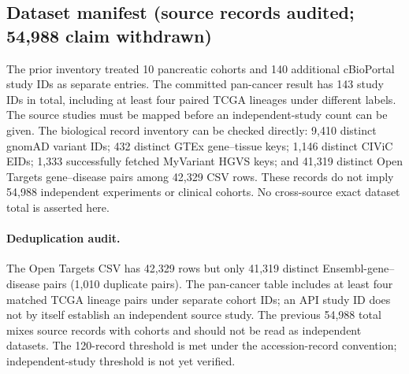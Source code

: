 \subsection{Dataset manifest (source records audited; 54,988 claim withdrawn)}
The prior inventory treated 10 pancreatic cohorts and 140 additional cBioPortal study IDs as separate entries. The committed pan-cancer result has 143 study IDs in total, including at least four paired TCGA lineages under different labels. The source studies must be mapped before an independent-study count can be given. The biological record inventory can be checked directly: 9,410 distinct gnomAD variant IDs; 432 distinct GTEx gene--tissue keys; 1,146 distinct CIViC EIDs; 1,333 successfully fetched MyVariant HGVS keys; and 41,319 distinct Open Targets gene--disease pairs among 42,329 CSV rows. These records do not imply 54,988 independent experiments or clinical cohorts. No cross-source exact dataset total is asserted here.

\paragraph{Deduplication audit.} The Open Targets CSV has 42,329 rows but only 41,319 distinct Ensembl-gene--disease pairs (1,010 duplicate pairs). The pan-cancer table includes at least four matched TCGA lineage pairs under separate cohort IDs; an API study ID does not by itself establish an independent source study. The previous 54,988 total mixes source records with cohorts and should not be read as independent datasets. The 120-record threshold is met under the accession-record convention; independent-study threshold is not yet verified.\\
